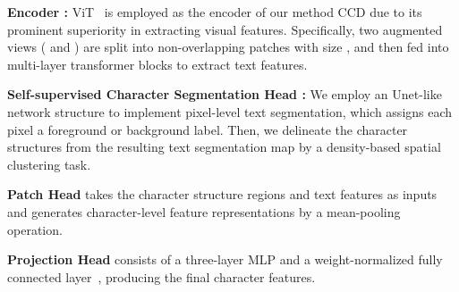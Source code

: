 \documentclass[10pt,twocolumn,letterpaper]{article}
\begin{document}
\noindent \textbf{Encoder :} ViT~\cite{ViT} is employed as the encoder of our method CCD due to its prominent superiority in extracting visual features. Specifically, two augmented views ( and ) are split into non-overlapping patches with size , and then fed into multi-layer transformer blocks to extract text features. 

\noindent \textbf{Self-supervised Character Segmentation Head :} 
We employ an Unet-like network structure to implement pixel-level text segmentation, which assigns each pixel a foreground or background label.
Then, we delineate the character structures from the resulting text segmentation map by a density-based spatial clustering task.

\noindent \textbf{Patch Head } 
takes the character structure regions and text features as inputs and generates character-level feature representations by a mean-pooling operation.

\noindent \textbf{Projection Head } consists of a three-layer MLP and a weight-normalized fully connected layer~\cite{Dino}, producing the final character features.
\end{document}
